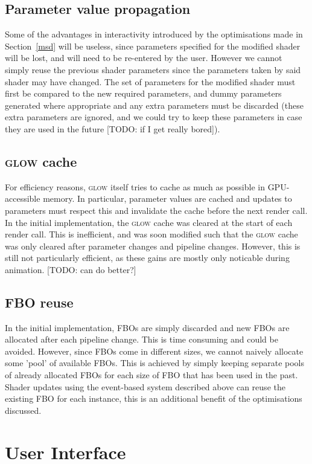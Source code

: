 \documentclass[12pt,twoside,notitlepage]{report}
\begin{document}
\subsection{Parameter value propagation}
Some of the advantages in interactivity introduced by the optimisations made in Section~\ref{msd} will be useless, since parameters specified for the modified shader will be lost, and will need to be re-entered by the user. However we cannot simply reuse the previous shader parameters since the parameters taken by said shader may have changed. The set of parameters for the modified shader must first be compared to the new required parameters, and dummy parameters generated where appropriate and any extra parameters must be discarded (these extra parameters are ignored, and we could try to keep these parameters in case they are used in the future [TODO: if I get really bored]). 

\subsection{\textsc{glow} cache}
\label{glow-cache}
For efficiency reasons, \textsc{glow} itself tries to cache as much as possible in GPU-accessible memory. In particular, parameter values are cached and updates to parameters must respect this and invalidate the cache before the next render call. In the initial implementation, the \textsc{glow} cache was cleared at the start of each render call. This is inefficient, and was soon modified such that the \textsc{glow} cache was only cleared after parameter changes and pipeline changes. However, this is still not particularly efficient, as these gains are mostly only noticable during animation. 
[TODO: can do better?]

\subsection{FBO reuse}
In the initial implementation, FBOs are simply discarded and new FBOs are allocated after each pipeline change. This is time consuming and could be avoided. However, since FBOs come in different sizes, we cannot naively allocate some 'pool' of available FBOs. This is achieved by simply keeping separate pools of already allocated FBOs for each size of FBO that has been used in the past. Shader updates using the event-based system described above can reuse the existing FBO for each instance, this is an additional benefit of the optimisations discussed.

\section{User Interface}
\end{document}

